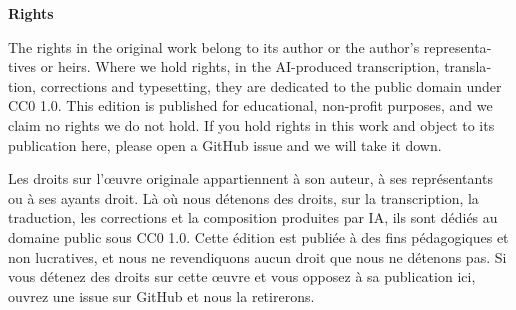 \documentclass[11pt,oneside]{article}
\DeclareRobustCommand{\[}{\begingroup\global\DERtaggedfalse\gdef\DERtagbody{}%
  \let\tag\DERtag\let\split\aligned\let\endsplit\endaligned\global\setbox\DERdispbox\hbox\bgroup$\displaystyle}
\DeclareRobustCommand{\]}{$\egroup\endgroup\DERshowdisplay}
\begin{document}
\begin{otherlanguage}{english}
\bigskip
\noindent\textbf{Rights}

\smallskip
\noindent The rights in the original work belong to its author or the author's representatives or heirs. Where we
hold rights, in the AI-produced transcription, translation, corrections and typesetting, they are dedicated to the
public domain under CC0 1.0. This edition is published for educational, non-profit purposes, and we claim no rights we
do not hold. If you hold rights in this work and object to its publication here, please open a GitHub issue and we will
take it down.
\end{otherlanguage}

\smallskip
\noindent Les droits sur l'œuvre originale appartiennent à son auteur, à ses représentants ou à ses ayants droit. Là
où nous détenons des droits, sur la transcription, la traduction, les corrections et la composition produites par IA,
ils sont dédiés au domaine public sous CC0 1.0. Cette édition est publiée à des fins pédagogiques et non lucratives, et
nous ne revendiquons aucun droit que nous ne détenons pas. Si vous détenez des droits sur cette œuvre et vous opposez
à sa publication ici, ouvrez une issue sur GitHub et nous la retirerons.
\clearpage
\tableofcontents






















\end{document}
